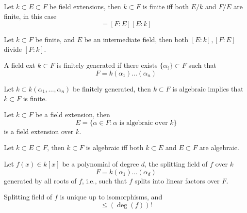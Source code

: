 \documentclass[openany]{book}
\begin{document}
\begin{prop}
    Let $k\subset E\subset F$ be field extensions, then $k\subset F$ is finite iff both $E/k$ and $F/E$ are finite, in this case 
    \begin{equation*}
        [F:k]=[F:E][E:k]
    \end{equation*}
\end{prop}


\begin{cor}
    Let $k\subset F$ be finite, and $E$ be an intermediate field, then both $[E:k],[F:E]$ divide $[F:k]$.
\end{cor}

\begin{defn}
    A field ext $k\subset F$  is finitely generated if there exists $\{\alpha_i\}\subset F$ such that 
    \begin{equation*}
        F=k(\alpha_1)\dots(\alpha_n)
    \end{equation*}
\end{defn}


\begin{prop}
    Let $k\subset k(\alpha_1,\dots,\alpha_n)$ be finitely generated, then
    $k\subset F$ is algebraic implies that $k\subset F$ is finite.
\end{prop}


\begin{cor}
    Let $k\subset F$ be a field extension, then 
    \begin{equation*}
        E=\{\alpha\in F: \alpha\text{ is algebraic over $k$}\}
    \end{equation*}
    is a field extension over $k$.
\end{cor}

\begin{cor}
    Let $k\subset E\subset F$, then $k\subset F$ is algebraic iff both $k\subset E$ and $E\subset F$ are algebraic.
\end{cor}


\begin{defn}
    Let $f(x)\in k[x]$ be a polynomial of degree $d$, the splitting field of $f$ over $k$ 
    \begin{equation*}
        F=k(\alpha_1)\dots(\alpha_d)
    \end{equation*}
    generated by all roots of $f$, i.e., such that $f$ splits into linear factors over $F$.
\end{defn}

\begin{prop}
    Splitting field of $f$ is unique up to isomorphisms, and 
    \begin{equation*}
        [F:k]\leq(\deg(f))!
    \end{equation*}
\end{prop}
\end{document}
